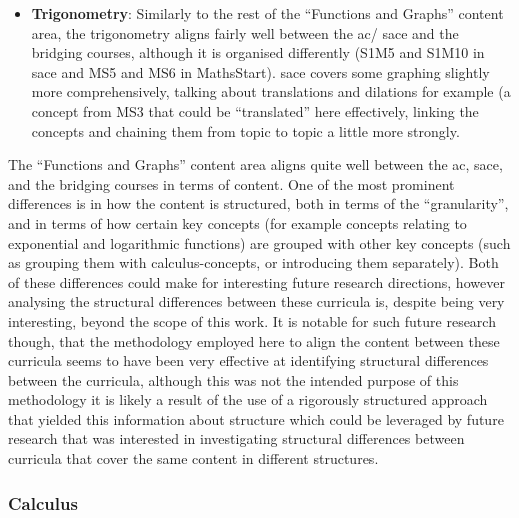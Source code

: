 \documentclass[twoside,12pt,a4paper]{report}
\begin{document}
\begin{itemize}
	\item \textbf{Trigonometry}: Similarly to the rest of the ``Functions and Graphs'' content area, the trigonometry aligns fairly well between the \gls{ac}/ \gls{sace} and the bridging courses, although it is organised differently (S1M5 and S1M10 in \gls{sace} and MS5 and MS6 in MathsStart). \gls{sace} covers some graphing slightly more comprehensively, talking about translations and dilations for example (a concept from MS3 that could be ``translated'' here effectively, linking the concepts and chaining them from topic to topic a little more strongly. 
\end{itemize}

The ``Functions and Graphs'' content area aligns quite well between the \gls{ac}, \gls{sace}, and the bridging courses in terms of content. One of the most prominent differences is in how the content is structured, both in terms of the ``granularity'', and in terms of how certain key concepts (for example concepts relating to exponential and logarithmic functions) are grouped with other key concepts (such as grouping them with calculus-concepts, or introducing them separately). Both of these differences could make for interesting future research directions, however analysing the structural differences between these curricula is, despite being very interesting, beyond the scope of this work. It is notable for such future research though, that the methodology employed here to align the content between these curricula seems to have been very effective at identifying structural differences between the curricula, although this was not the intended purpose of this methodology it is likely a result of the use of a rigorously structured approach that yielded this information about structure which could be leveraged by future research that was interested in investigating structural differences between curricula that cover the same content in different structures.


\subsubsection{Calculus}
\end{document}
